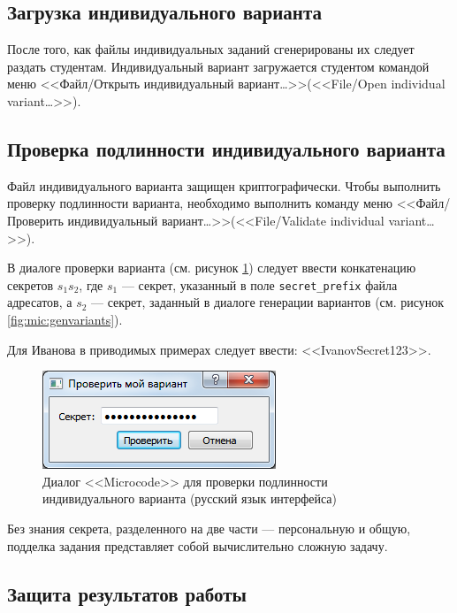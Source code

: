 \subsection{Загрузка индивидуального варианта}

После того, как файлы индивидуальных заданий сгенерированы их следует раздать студентам. Индивидуальный вариант загружается студентом командой меню <<Файл/Открыть индивидуальный вариант\ldots>>(<<File/Open individual variant\ldots>>).


\subsection{Проверка подлинности индивидуального варианта}
\label{ss:mic:check}

Файл индивидуального варианта защищен криптографически. Чтобы выполнить проверку подлинности варианта, необходимо выполнить команду меню <<Файл/Проверить индивидуальный вариант\ldots>>(<<File/Validate individual variant\ldots>>).

В диалоге проверки варианта (см. рисунок \ref{fig:mic:checkvarian}) следует ввести конкатенацию секретов $s_1s_2$, где $s_1$ --- секрет, указанный в поле \verb"secret_prefix" файла адресатов, а $s_2$ --- секрет, заданный в диалоге генерации вариантов (см. рисунок \ref{fig:mic:genvariants}).

Для Иванова в приводимых примерах следует ввести: <<IvanovSecret123>>.

\begin{figure}[!ht]
    \centering
    \includegraphics{fig/checkvarian}
    \caption{Диалог <<Microcode>> для проверки подлинности индивидуального варианта (русский язык интерфейса)}\label{fig:mic:checkvarian}
\end{figure}

Без знания секрета, разделенного на две части --- персональную и общую, подделка задания представляет собой вычислительно сложную задачу.

\subsection{Защита результатов работы}

